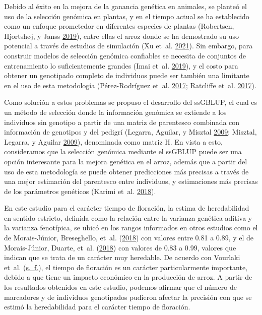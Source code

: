 \documentclass[11pt,spanish,a4paper,oneside,]{book} %
\begin{document}
Debido al éxito en la mejora de la ganancia genética en animales, se planteó el uso de la selección genómica en plantas, y en el tiempo actual se ha establecido como un enfoque prometedor en diferentes especies de plantas (Robertsen, Hjortshøj, y Janss \protect\hyperlink{ref-cite:63}{2019}), entre ellas el arroz donde se ha demostrado su uso potencial a través de estudios de simulación (Xu et~al. \protect\hyperlink{ref-cite:60}{2021}). Sin embargo, para construir modelos de selección genómica confiables se necesita de conjuntos de entrenamiento lo suficientemente grandes (Imai et~al. \protect\hyperlink{ref-cite:20}{2019}), y el costo para obtener un genotipado completo de individuos puede ser también una limitante en el uso de esta metodología (Pérez-Rodríguez et~al. \protect\hyperlink{ref-cite:19}{2017}; Ratcliffe et~al. \protect\hyperlink{ref-cite:72}{2017}).

Como solución a estos problemas se propuso el desarrollo del ssGBLUP, el cual es un método de selección donde la información genómica se extiende a los individuos sin genotipo a partir de una matriz de parentesco combinada con información de genotipos y del pedigrí (Legarra, Aguilar, y Misztal \protect\hyperlink{ref-cite:17}{2009}; Misztal, Legarra, y Aguilar \protect\hyperlink{ref-cite:16}{2009}), denominada como matriz H. En vista a esto, consideramos que la selección genómica mediante el ssGBLUP puede ser una opción interesante para la mejora genética en el arroz, además que a partir del uso de esta metodología se puede obtener predicciones más precisas a través de una mejor estimación del parentesco entre individuos, y estimaciones más precisas de los parámetros genéticos (Karimi et~al. \protect\hyperlink{ref-cite:76}{2018}).

En este estudio para el carácter tiempo de floración, la estima de heredabilidad en sentido estricto, definida como la relación entre la varianza genética aditiva y la varianza fenotípica, se ubicó en los rangos informados en otros estudios como el de Morais-Júnior, Breseghello, et~al. (\protect\hyperlink{ref-cite:68}{2018}) con valores entre 0.81 a 0.89, y el de Morais-Júnior, Duarte, et~al. (\protect\hyperlink{ref-cite:69}{2018}) con valores de 0.83 a 0.99, valores que indican que se trata de un carácter muy heredable. De acuerdo con Vourlaki et~al. (\protect\hyperlink{ref-cite:26}{s.~f.}), el tiempo de floración es un carácter particularmente importante, debido a que tiene un impacto económico en la producción de arroz. A partir de los resultados obtenidos en este estudio, podemos afirmar que el número de marcadores y de individuos genotipados pudieron afectar la precisión con que se estimó la heredabilidad para el carácter tiempo de floración.
\end{document}
